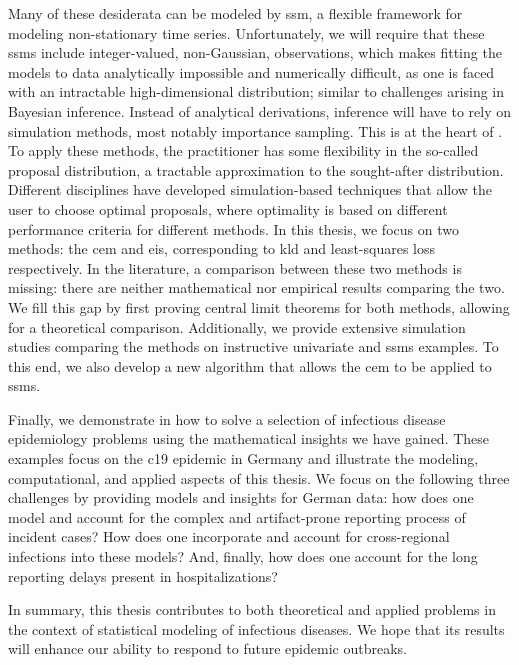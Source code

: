 Many of these desiderata can be modeled by \gls{ssm}, a flexible framework for modeling non-stationary time series. Unfortunately, we will require that these \glspl{ssm} include integer-valued, non-Gaussian, observations, which makes fitting the models to data analytically impossible and numerically difficult, as one is faced with an intractable high-dimensional distribution; similar to challenges arising in Bayesian inference. Instead of analytical derivations, inference will have to rely on simulation methods, most notably importance sampling. This is at the heart of . To apply these methods, the practitioner has some flexibility in the so-called proposal distribution, a tractable approximation to the sought-after distribution. Different disciplines have developed simulation-based techniques that allow the user to choose optimal proposals, where optimality is based on different performance criteria for different methods. In this thesis, we focus on two methods: the \gls{cem} and \gls{eis}, corresponding to \acrlong{kld} and least-squares loss respectively. In the literature, a comparison between these two methods is missing: there are neither mathematical nor empirical results comparing the two. We fill this gap by first proving central limit theorems for both methods, allowing for a theoretical comparison. Additionally, we provide extensive simulation studies comparing the methods on instructive univariate and \glspl{ssm} examples. To this end, we also develop a new algorithm that allows the \gls{cem} to be applied to \glspl{ssm}. 

Finally, we demonstrate in  how to solve a selection of infectious disease epidemiology problems using the mathematical insights we have gained. These examples focus on the \gls{c19} epidemic in Germany and illustrate the modeling, computational, and applied aspects of this thesis. We focus on the following three challenges by providing models and insights for German data: how does one model and account for the complex and artifact-prone reporting process of incident cases? How does one incorporate and account for cross-regional infections into these models? And, finally, how does one account for the long reporting delays present in hospitalizations?

In summary, this thesis contributes to both theoretical and applied problems in the context of statistical modeling of infectious diseases. 
We hope that its results will enhance our ability to respond to future epidemic outbreaks.